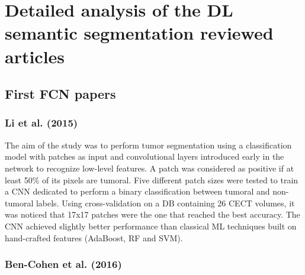 \chapter{Detailed analysis of the DL semantic segmentation reviewed
articles
}\label{detailed-analysis-of-the-dl-semantic-segmentation-reviewed-articles}

\section{First FCN papers}\label{first-fcn-papers}

\subsection{Li et al. (2015)}\label{li-et-al.-2015}

The aim of the study was to perform tumor segmentation using a
classification model with patches as input and convolutional layers
introduced early in the network to recognize low-level features. A patch
was considered as positive if at least 50\% of its pixels are tumoral.
Five different patch sizes were tested to train a CNN dedicated to
perform a binary classification between tumoral and non-tumoral labels.
Using cross-validation on a DB containing 26 CECT volumes, it was
noticed that 17x17 patches were the one that reached the best accuracy.
The CNN achieved slightly better performance than classical ML
techniques built on hand-crafted features (AdaBoost, RF and SVM).

\subsection{Ben-Cohen et al. (2016)}\label{ben-cohen-et-al.-2016}

